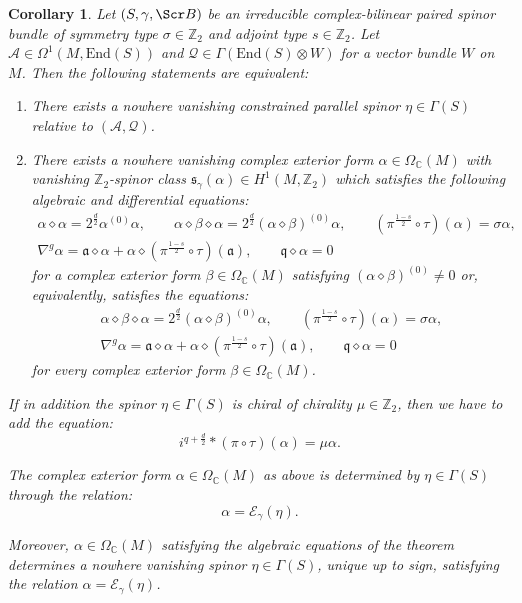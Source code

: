 \documentclass[10pt,a4paper,twoside,reqno]{amsart}
\theoremstyle{plain}
\newtheorem{cor}[thm]{Corollary}
\theoremstyle{definition}
\theoremstyle{remark}
\newcommand{\End}{\mathrm{End}}
\def\Z{\mathbb{Z}}
\def\C{\mathbb{C}}
\def\cQ{\mathcal{Q}}
\def\fra{\mathfrak{a}}
\def\frq{\mathfrak{q}}
\def\scB{\Scr B}
\def\cA{\mathcal{A}}
\def\cE{\mathcal{E}}
\begin{document}
\begin{cor}\label{cor:spin_CB_CPS}
    Let $(S,\gamma,\scB)$ be an irreducible complex-bilinear paired spinor bundle of symmetry type $\sigma\in\Z_2$ and adjoint type $s\in\Z_2$. Let $\cA\in\Omega^1(M,\End(S))$ and $\cQ\in\Gamma(\End(S)\otimes W)$ for a vector bundle $W$ on $M$. Then the following statements are equivalent: 
    \begin{enumerate}
        \item[\normalfont(a)] There exists a nowhere vanishing constrained parallel spinor $\eta\in\Gamma(S)$ relative to $(\cA,\cQ)$.
        \item[\normalfont(b)] There exists a nowhere vanishing complex exterior form $\alpha\in\Omega_\C(M)$ with vanishing $\mathbb{Z}_2$-spinor class $\mathfrak{s}_{\gamma}(\alpha)\in H^1(M,\Z_2)$ which satisfies the following algebraic and differential equations: 
        \begin{gather*}
            \alpha\diamond\alpha=2^{\frac{d}{2}}\alpha^{(0)}\alpha,\qquad \alpha\diamond\beta\diamond\alpha=2^{\frac{d}{2}}(\alpha\diamond\beta)^{(0)}\alpha,\qquad (\pi^{\frac{1-s}{2}}\circ\tau)(\alpha)=\sigma\alpha,\\
            \nabla^g\alpha=\fra\diamond\alpha+\alpha\diamond(\pi^{\frac{1-s}{2}}\circ\tau)(\fra),\qquad \frq\diamond\alpha=0
        \end{gather*} for a complex exterior form $\beta\in\Omega_\C(M)$ satisfying $(\alpha\diamond\beta)^{(0)}\neq0$ or, equivalently, satisfies the equations: \begin{gather*}
            \alpha\diamond\beta\diamond\alpha=2^{\frac{d}{2}}(\alpha\diamond\beta)^{(0)}\alpha,\qquad (\pi^{\frac{1-s}{2}}\circ\tau)(\alpha)=\sigma\alpha,\\
            \nabla^g\alpha=\fra\diamond\alpha+\alpha\diamond(\pi^{\frac{1-s}{2}}\circ\tau)(\fra),\qquad \frq\diamond\alpha=0
        \end{gather*} for every complex exterior form $\beta\in\Omega_\C(M)$.
    \end{enumerate}

    If in addition the spinor $\eta\in\Gamma(S)$ is chiral of chirality $\mu\in\Z_2$, then we have to add the equation: $$i^{q+\frac{d}{2}}*(\pi\circ\tau)(\alpha)=\mu\alpha.$$

    The complex exterior form $\alpha\in\Omega_\C(M)$ as above is determined by $\eta\in\Gamma(S)$ through the relation: $$\alpha=\cE_\gamma(\eta).$$
    
    Moreover, $\alpha\in\Omega_\C(M)$ satisfying the algebraic equations of the theorem determines a nowhere vanishing spinor $\eta\in\Gamma(S)$, unique up to sign, satisfying the relation $\alpha=\cE_\gamma(\eta)$.
\end{cor}
\end{document}
